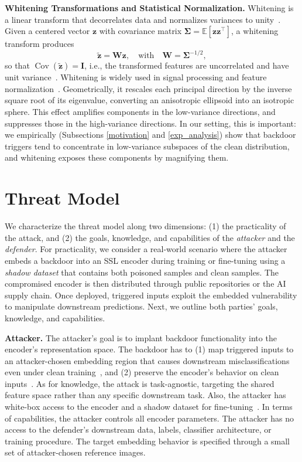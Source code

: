 \documentclass[letterpaper,twocolumn,10pt]{article}
\begin{document}

\par \textbf{Whitening Transformations and Statistical Normalization.}
Whitening is a linear transform that decorrelates data and normalizes variances to unity~\cite{kessy2018optimal}. Given a centered vector $\mathbf{z}$ with covariance matrix $\bm{\Sigma} = \mathbb{E}[\mathbf{z}\mathbf{z}^\top]$, a whitening transform produces
\[
\tilde{\mathbf{z}} = \mathbf{W}\mathbf{z}, \quad \text{with} \quad \mathbf{W} = \bm{\Sigma}^{-1/2},
\]
so that $\operatorname{Cov}(\tilde{\mathbf{z}})=\mathbf{I}$, i.e., the transformed features are uncorrelated and have unit variance~\cite{kessy2018optimal}. Whitening is widely used in signal processing and feature normalization~\cite{chen2020concept,soon2019vehicle,cho2019image}. Geometrically, it rescales each principal direction by the inverse square root of its eigenvalue, converting an anisotropic ellipsoid into an isotropic sphere. This effect amplifies components in the low-variance directions, and suppresses those in the high-variance directions. In our setting, this is important: we empirically (Subsections \ref{motivation} and \ref{exp_analysis}) show that backdoor triggers tend to concentrate in low-variance subspaces of the clean distribution, and whitening exposes these components by magnifying them.

\section{Threat Model}
\label{threat_model}
We characterize the threat model along two dimensions: (1) the practicality of the attack, and (2) the goals, knowledge, and capabilities of the \textit{attacker} and the \textit{defender}. For practicality, we consider a real-world scenario where the attacker embeds a backdoor into an SSL encoder during training or fine-tuning using a \textit{shadow dataset} that contains both poisoned samples and clean samples. The compromised encoder is then distributed through public repositories or the AI supply chain. Once deployed, triggered inputs exploit the embedded vulnerability to manipulate downstream predictions. Next, we outline both parties' goals, knowledge, and capabilities.

\par \textbf{Attacker.} The attacker's goal is to implant backdoor functionality into the encoder's representation space. The backdoor has to (1) map triggered inputs to an attacker-chosen embedding region that causes downstream misclassifications even under clean training~\cite{abbasi2025backdoorattacksdefensescomputer}, and (2) preserve the encoder's behavior on clean inputs~\cite{abbasi2025backdoorattacksdefensescomputer}. As for knowledge, the attack is task-agnostic, targeting the shared feature space rather than any specific downstream task. Also, the attacker has white-box access to the encoder and a shadow dataset for fine-tuning~\cite{hou2025dede}. In terms of capabilities, the attacker controls all encoder parameters. The attacker has no access to the defender's downstream data, labels, classifier architecture, or training procedure. The target embedding behavior is specified through a small set of attacker-chosen reference images.
\end{document}
